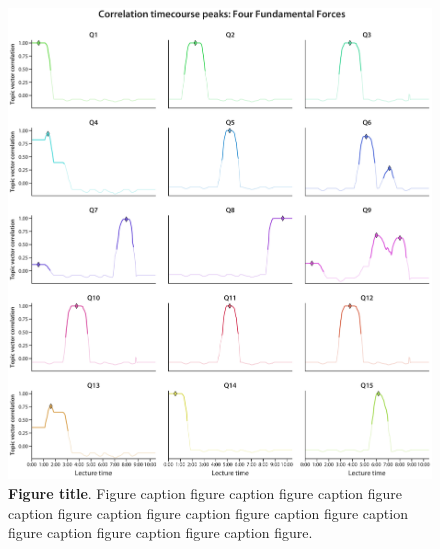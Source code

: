 \documentclass[10pt]{article}
\begin{document}
\begin{figure}[tp]
    \centering
    \includegraphics[width=\textwidth]{figs/forces-qcorrs-peaks}

    \caption{\textbf{Figure title}. Figure caption figure caption figure caption figure caption figure caption figure caption figure caption figure caption figure caption figure caption figure caption figure.}

    \label{fig:forces-peaks}
\end{figure}
\end{document}
